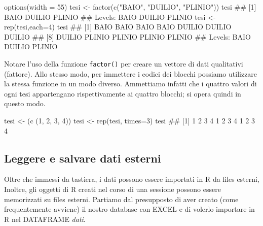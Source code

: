\documentclass[a4paper,12pt,oneside]{book}
\newenvironment{Shaded}{}{}
\newcommand{\KeywordTok}[1]{#1}
\newcommand{\DataTypeTok}[1]{#1}
\newcommand{\DecValTok}[1]{#1}
\newcommand{\StringTok}[1]{#1}
\newcommand{\CommentTok}[1]{#1}
\newcommand{\NormalTok}[1]{#1}
\begin{document}
\begin{Shaded}
\begin{Highlighting}[]
\KeywordTok{options}\NormalTok{(}\DataTypeTok{width =} \DecValTok{55}\NormalTok{)}
\NormalTok{tesi  <-}\StringTok{  }\KeywordTok{factor}\NormalTok{(}\KeywordTok{c}\NormalTok{(}\StringTok{"BAIO"}\NormalTok{, }\StringTok{"DUILIO"}\NormalTok{, }\StringTok{"PLINIO"}\NormalTok{))}
\NormalTok{tesi}
\CommentTok{## [1] BAIO   DUILIO PLINIO}
\CommentTok{## Levels: BAIO DUILIO PLINIO}
\NormalTok{tesi  <-}\StringTok{  }\KeywordTok{rep}\NormalTok{(tesi,}\DataTypeTok{each=}\DecValTok{4}\NormalTok{)}
\NormalTok{tesi}
\CommentTok{##  [1] BAIO   BAIO   BAIO   BAIO   DUILIO DUILIO DUILIO}
\CommentTok{##  [8] DUILIO PLINIO PLINIO PLINIO PLINIO}
\CommentTok{## Levels: BAIO DUILIO PLINIO}
\end{Highlighting}
\end{Shaded}

Notare l'uso della funzione \texttt{factor()} per creare un vettore di dati qualitativi (fattore).
Allo stesso modo, per immettere i codici dei blocchi possiamo utilizzare la stessa funzione in un modo diverso. Ammettiamo infatti che i quattro valori di ogni tesi appartengano rispettivamente ai quattro blocchi; si opera quindi in questo modo.

\begin{Shaded}
\begin{Highlighting}[]
\NormalTok{tesi  <-}\StringTok{  }\NormalTok{(}\KeywordTok{c}\NormalTok{ (}\DecValTok{1}\NormalTok{, }\DecValTok{2}\NormalTok{, }\DecValTok{3}\NormalTok{, }\DecValTok{4}\NormalTok{))}
\NormalTok{tesi <-}\StringTok{ }\KeywordTok{rep}\NormalTok{(tesi, }\DataTypeTok{times=}\DecValTok{3}\NormalTok{)}
\NormalTok{tesi}
\CommentTok{##  [1] 1 2 3 4 1 2 3 4 1 2 3 4}
\end{Highlighting}
\end{Shaded}

\hypertarget{leggere-e-salvare-dati-esterni}{%
\subsection*{Leggere e salvare dati esterni}\label{leggere-e-salvare-dati-esterni}}

Oltre che immessi da tastiera, i dati possono essere importati in R da files esterni, Inoltre, gli oggetti di R creati nel corso di una sessione possono essere memorizzati su files esterni. Partiamo dal presupposto di aver creato (come frequentemente avviene) il nostro database con EXCEL e di volerlo importare in R nel DATAFRAME \emph{dati}.
\end{document}
